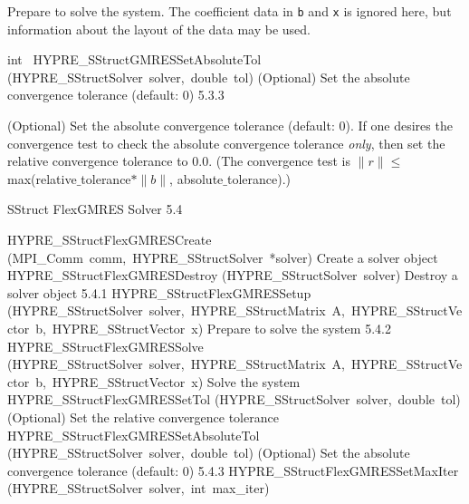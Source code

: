 \documentclass{article}
\begin{document}
\begin{cxxentry}
\begin{cxxentry}
\begin{cxxfunction}
\begin{cxxdoc}
Prepare to solve the system.  The coefficient data in {\tt b} and {\tt x} is
ignored here, but information about the layout of the data may be used.
\end{cxxdoc}
\end{cxxfunction}
\begin{cxxfunction}
{int\ }
        {HYPRE\_SStructGMRESSetAbsoluteTol}
        {(HYPRE\_SStructSolver\ solver,\ double\ tol)}
        {
(Optional) Set the absolute convergence tolerance  (default: 0)}
        {5.3.3}
\begin{cxxdoc}

(Optional) Set the absolute convergence tolerance  (default: 0).
If one desires
the convergence test to check the absolute convergence tolerance {\it only}, then
set the relative convergence tolerance to 0.0.  (The convergence test is 
$\|r\| \leq$ max(relative$\_$tolerance$\ast \|b\|$, absolute$\_$tolerance).)
\end{cxxdoc}
\end{cxxfunction}
\end{cxxentry}
\begin{cxxentry}
{}
        {SStruct FlexGMRES Solver}
        {}
        {
}
        {5.4}
\begin{cxxnames}
        {HYPRE\_SStructFlexGMRESCreate}
        {(MPI\_Comm\ comm,\ HYPRE\_SStructSolver\ *solver)}
        {
Create a solver object}
        {}
\label{cxx.5.4.4}
        {HYPRE\_SStructFlexGMRESDestroy}
        {(HYPRE\_SStructSolver\ solver)}
        {
Destroy a solver object}
        {5.4.1}
        {HYPRE\_SStructFlexGMRESSetup}
        {(HYPRE\_SStructSolver\ solver,\ HYPRE\_SStructMatrix\ A,\ HYPRE\_SStructVector\ b,\ HYPRE\_SStructVector\ x)}
        {
Prepare to solve the system}
        {5.4.2}
        {HYPRE\_SStructFlexGMRESSolve}
        {(HYPRE\_SStructSolver\ solver,\ HYPRE\_SStructMatrix\ A,\ HYPRE\_SStructVector\ b,\ HYPRE\_SStructVector\ x)}
        {
Solve the system}
        {}
\label{cxx.5.4.5}
        {HYPRE\_SStructFlexGMRESSetTol}
        {(HYPRE\_SStructSolver\ solver,\ double\ tol)}
        {
(Optional) Set the relative convergence tolerance}
        {}
\label{cxx.5.4.6}
        {HYPRE\_SStructFlexGMRESSetAbsoluteTol}
        {(HYPRE\_SStructSolver\ solver,\ double\ tol)}
        {
(Optional) Set the absolute convergence tolerance (default: 0)}
        {5.4.3}
        {HYPRE\_SStructFlexGMRESSetMaxIter}
        {(HYPRE\_SStructSolver\ solver,\ int\ max\_iter)}
        {
}
\end{cxxnames}
\end{cxxentry}
\end{cxxentry}
\end{document}
